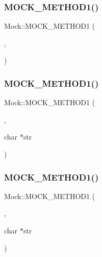 \mbox{\label{class_mock_ada59eea6991953353f332e3ea1e74444}} 
\subsubsection{\texorpdfstring{MOCK\_METHOD1()}{MOCK\_METHOD1()}\hspace{0.1cm}{\footnotesize\ttfamily [3/27]}}
{\footnotesize\ttfamily Mock\+::\+M\+O\+C\+K\+\_\+\+M\+E\+T\+H\+O\+D1 (\begin{DoxyParamCaption}\item[{\mbox{\hyperlink{class_interface_a65d6ae604e7e9a513aec72c9c94e0b97}{Void\+From\+String}}}]{,  }\item[{void(char $\ast$str)}]{ }\end{DoxyParamCaption})}

\mbox{\label{class_mock_a2db4d82b6f92b4e462929f651ac4c3b1}} 
\subsubsection{\texorpdfstring{MOCK\_METHOD1()}{MOCK\_METHOD1()}\hspace{0.1cm}{\footnotesize\ttfamily [4/27]}}
{\footnotesize\ttfamily Mock\+::\+M\+O\+C\+K\+\_\+\+M\+E\+T\+H\+O\+D1 (\begin{DoxyParamCaption}\item[{\mbox{\hyperlink{class_interface_a756b1d22c12aa3f14a5083f90043fbf0}{String\+From\+String}}}]{,  }\item[{char $\ast$}]{char $\ast$str }\end{DoxyParamCaption})}

\mbox{\label{class_mock_a2db4d82b6f92b4e462929f651ac4c3b1}} 
\subsubsection{\texorpdfstring{MOCK\_METHOD1()}{MOCK\_METHOD1()}\hspace{0.1cm}{\footnotesize\ttfamily [5/27]}}
{\footnotesize\ttfamily Mock\+::\+M\+O\+C\+K\+\_\+\+M\+E\+T\+H\+O\+D1 (\begin{DoxyParamCaption}\item[{\mbox{\hyperlink{class_interface_a756b1d22c12aa3f14a5083f90043fbf0}{String\+From\+String}}}]{,  }\item[{char $\ast$}]{char $\ast$str }\end{DoxyParamCaption})}

